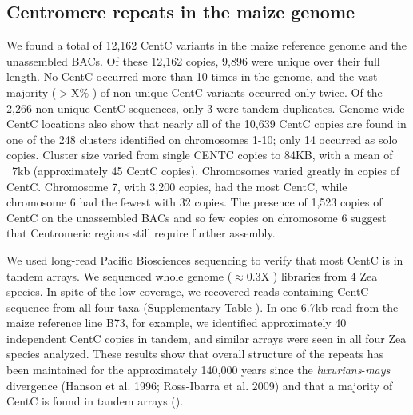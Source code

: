 \subsection*{Centromere repeats in the maize genome}

We found a total of 12,162 CentC variants in the maize reference genome and the unassembled BACs.  Of these 12,162 copies, 9,896 were unique over their full length. No CentC occurred more than 10 times in the genome, and the vast majority ($>$X\% ) of non-unique CentC variants occurred only twice.  Of the 2,266 non-unique CentC sequences, only 3 were tandem duplicates.  Genome-wide CentC locations also show that nearly all of the 10,639 CentC copies are found in one of the 248 clusters identified on chromosomes 1-10; only 14 occurred as solo copies.  Cluster size varied from single CENTC copies to 84KB, with a mean of ~7kb (approximately 45 CentC copies). Chromosomes varied greatly in copies of CentC.   Chromosome 7, with 3,200 copies, had the most CentC, while chromosome 6 had the fewest with 32 copies.  The presence of 1,523 copies of CentC on the unassembled BACs and so few copies on chromosome 6 suggest that Centromeric regions still require further assembly.  

We used long-read Pacific Biosciences sequencing to verify that most CentC is in tandem arrays. We sequenced whole genome ($\approx 0.3$X ) libraries from 4 Zea species.  In spite of the low coverage, we recovered reads containing CentC sequence from all four taxa (Supplementary Table ).  In one 6.7kb read from the maize reference line B73, for example, we identified approximately 40 independent CentC copies in tandem, and similar arrays were seen in all four Zea species analyzed.  These results show that overall structure of the repeats has been maintained for the approximately 140,000 years since the \emph{luxurians}-\emph{mays} divergence (Hanson et al. 1996; Ross-Ibarra et al. 2009) and that a majority of CentC is found in tandem arrays (). 

